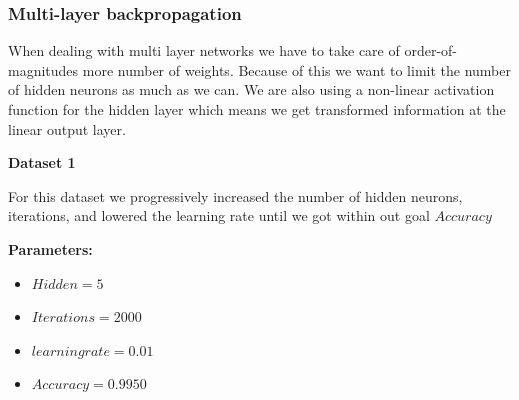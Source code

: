 \documentclass[a4paper,12pt]{article}
\begin{document}
\subsubsection{Multi-layer backpropagation}

When dealing with multi layer networks we have to take care of order-of-magnitudes more number of weights. Because of this we want to limit the number of hidden neurons as much as we can. We are also using a non-linear activation function for the hidden layer which means we get transformed information at the linear output layer.

\noindent \textbf{Dataset 1}

For this dataset we progressively increased the number of hidden neurons, iterations, and lowered the learning rate until we got within out goal $Accuracy$

\textbf{Parameters:}
\begin{itemize}
\item $Hidden = 5$
\item $Iterations = 2000$
\item $learning rate = 0.01$
\item $Accuracy = 0.9950$
\end{itemize}
\end{document}
